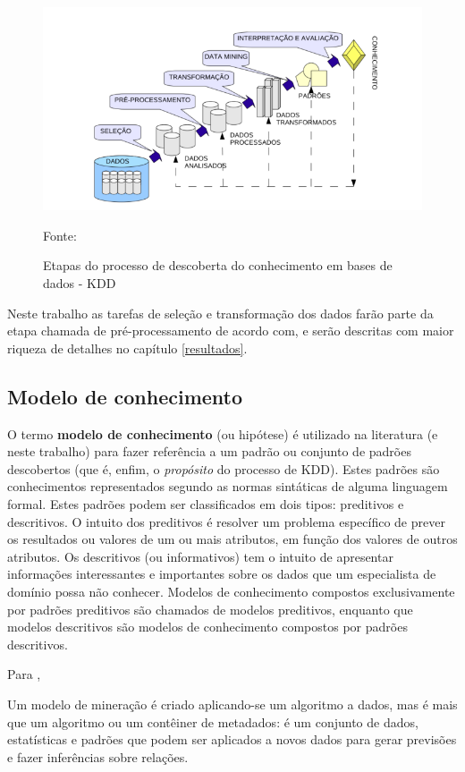 \begin{figure}[h!]
	\centering
	\includegraphics[width=.6\textwidth]{imagens/processo-KDD.png}
	\caption{Etapas do processo de descoberta do conhecimento em bases de dados - KDD}
	{\scriptsize Fonte: \cite[p. 7]{vasconcelos_aplicacao_2018}}
	\label{fig:processo-KDD}
\end{figure}


Neste trabalho as tarefas de seleção e transformação dos dados farão parte da etapa chamada de pré-processamento de acordo com, \cite{Boscarioli2017} e serão descritas com maior riqueza de detalhes no capítulo \ref{resultados}.

\subsection{Modelo de conhecimento}\label{modelo_conhecimento}
O termo \textbf{modelo de conhecimento} (ou hipótese) é utilizado na literatura (e neste trabalho) para fazer referência a um padrão ou conjunto de padrões descobertos (que é, enfim, o \textit{propósito} do processo de KDD). Estes padrões são conhecimentos representados segundo as normas sintáticas de alguma linguagem formal. Estes padrões podem ser classificados em dois tipos: preditivos e descritivos. O intuito dos preditivos é resolver um problema específico de prever os resultados ou valores de um ou mais atributos, em função dos valores de outros atributos. Os descritivos (ou informativos) tem o intuito de apresentar informações interessantes e importantes sobre os dados que um especialista de domínio possa não conhecer. Modelos de conhecimento compostos exclusivamente por padrões preditivos são chamados de modelos preditivos, enquanto que modelos descritivos são modelos de conhecimento compostos por padrões descritivos. \cite{goldschmidt2005}\cite{ferrari2017}\cite{Boscarioli2017}

Para , \begin{citacao}
	Um modelo de mineração é criado aplicando-se um algoritmo a dados, mas é mais que um algoritmo ou um contêiner de metadados: é um conjunto de dados, estatísticas e padrões que podem ser aplicados a novos dados para gerar previsões e fazer inferências sobre relações.
\end{citacao}

